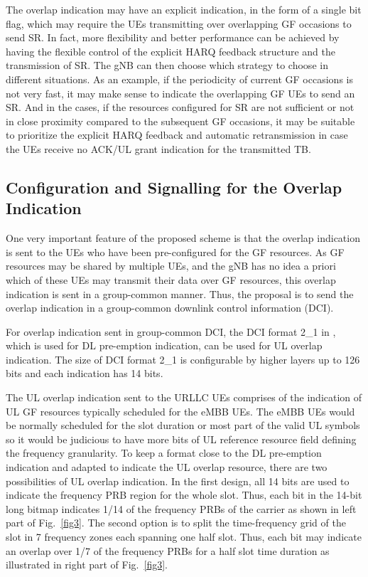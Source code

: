 \documentclass[conference]{IEEEtran}
\begin{document}
The overlap indication may have an explicit indication, in the form of a single bit flag, which may require the UEs transmitting over overlapping GF occasions to send SR. In fact, more flexibility and better performance can be achieved by having the flexible control of the explicit HARQ feedback structure and the transmission of SR. The gNB can then choose which strategy to choose in different situations. As an example, if the periodicity of current GF occasions is not very fast, it may make sense to indicate the overlapping GF UEs to send an SR. And in the cases, if the resources configured for SR are not sufficient or not in close proximity compared to the subsequent GF occasions, it may be suitable to prioritize the explicit HARQ feedback and automatic retransmission in case the UEs receive no ACK/UL grant indication for the transmitted TB.

\subsection{Configuration and Signalling for the Overlap Indication}\label{IICC}
One very important feature of the proposed scheme is that the overlap indication is sent to the UEs who have been pre-configured for the GF resources. As GF resources may be shared by multiple UEs, and the gNB has no idea a priori which of these UEs may transmit their data over GF resources, this overlap indication is sent in a group-common manner. Thus, the proposal is to send the overlap indication in a group-common downlink control information (DCI).

For overlap indication sent in group-common DCI, the DCI format 2\_1 in \cite{ad6}, which is used for DL pre-emption indication, can be used for UL overlap indication. The size of DCI format 2\_1 is configurable by higher layers up to 126 bits and each indication has 14 bits. 

The UL overlap indication sent to the URLLC UEs comprises of the indication of UL GF resources typically scheduled for the eMBB UEs. The eMBB UEs would be normally scheduled for the slot duration or most part of the valid UL symbols so it would be judicious to have more bits of UL reference resource field defining the frequency granularity. To keep a format close to the DL pre-emption indication and adapted to indicate the UL overlap resource, there are two possibilities of UL overlap indication. In the first design, all 14 bits are used to indicate the frequency PRB region for the whole slot. Thus, each bit in the 14-bit long bitmap indicates 1/14 of the frequency PRBs of the carrier as shown in left part of Fig.~\ref{fig3}. The second option is to split the time-frequency grid of the slot in 7 frequency zones each spanning one half slot. Thus, each bit may indicate an overlap over 1/7 of the frequency PRBs for a half slot time duration as illustrated in right part of Fig.~\ref{fig3}. 
\end{document}
